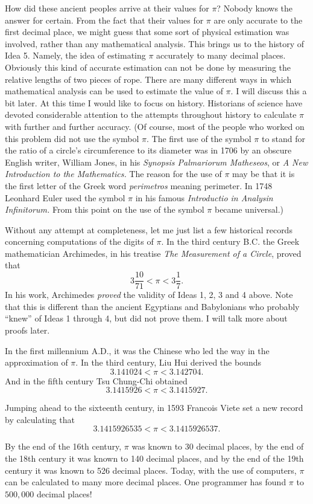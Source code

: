 \documentclass[twoside,twocolumn,12pt]{amsart}
\theoremstyle{plain}
\theoremstyle{definition}
\begin{document}
How did these ancient peoples arrive at their values for $\pi$? Nobody
knows the answer for certain. From the fact that their values for
$\pi$ are only accurate to the first decimal place, we might guess
that some sort of physical estimation was involved, rather than any
mathematical analysis. This brings us to the history of Idea 5.
Namely, the idea of estimating $\pi$ accurately to many decimal places.
Obviously this kind of accurate estimation can not be done by measuring
the relative lengths of two pieces of rope. There are many different
ways in which mathematical analysis can be used to estimate the value
of $\pi$. I will discuss this a bit later. At this time I would like
to focus on history. Historians of science have devoted considerable
attention to the attempts throughout history to calculate $\pi$ with
further and further accuracy. (Of course, most of the people who worked
on this problem did not use the symbol $\pi$. The first use of the
symbol $\pi$ to stand for the ratio of a circle's circumference to
its diameter was in 1706 by an obscure English writer, William Jones, in
his \emph{Synopsis Palmariorum Matheseos}, or \emph{A New Introduction
to the Mathematics.} The reason for the use of $\pi$ may be that it is
the first letter of the Greek word \emph{perimetros} meaning perimeter.
In 1748 Leonhard Euler used the symbol $\pi$ in his
famous \emph{Introductio in Analysin Infinitorum.} From this point on
the use of the symbol $\pi$ became universal.)

Without any attempt at completeness, let me just
list a few historical records concerning computations of the digits
of $\pi$. In the third century B.C. the Greek mathematician Archimedes,
in his treatise \emph{The Measurement of a Circle}, proved that
$$3\frac{10}{71}<\pi<3\frac{1}{7}.$$
In his work, Archimedes \emph{proved}
the validity of Ideas 1, 2, 3 and 4 above. Note that this is
different than the ancient Egyptians and Babylonians who probably
``knew'' of Ideas 1 through 4, but did not prove them. I will talk
more about proofs later.

In the first millennium A.D., it was
the Chinese who led the way in the approximation of $\pi$. In the third
century, Liu Hui derived the bounds
$$3.141024<\pi<3.142704.$$
And in the fifth century Tsu Chung-Chi obtained
$$3.1415926<\pi<3.1415927.$$

Jumping ahead to the sixteenth century, in 1593 Francois Viete set a
new record by calculating that
$$3.1415926535<\pi<3.1415926537.$$

By the end of the 16th century, $\pi$ was known to 30 decimal places,
by the end of the 18th century it was known to 140 decimal places,
and by the end of the 19th century it was known to 526 decimal places.
Today, with the use of computers, $\pi$ can be calculated to many
more decimal places. One programmer has found $\pi$  to
$500,000$ decimal places!
\end{document}
